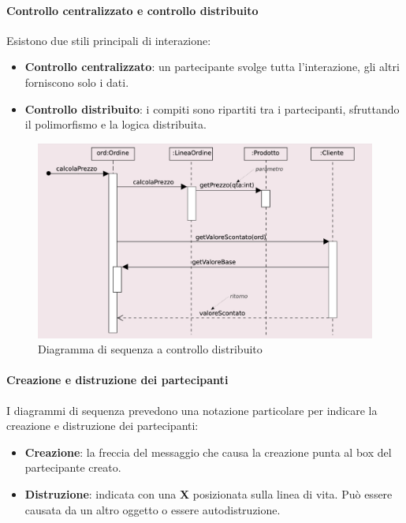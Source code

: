 \paragraph{Controllo centralizzato e controllo distribuito}
Esistono due stili principali di interazione:
\begin{itemize}
    \item \textbf{Controllo centralizzato}: un partecipante svolge tutta l’interazione, gli altri forniscono solo i dati.
    \item \textbf{Controllo distribuito}: i compiti sono ripartiti tra i partecipanti, sfruttando il polimorfismo e la logica distribuita.
\end{itemize}

\begin{figure}[H]
    \centering
    \includegraphics[width=0.75\linewidth]{assets/UML/sequence/sequence-2.png}
    \caption{Diagramma di sequenza a controllo distribuito}
\end{figure}

\paragraph{Creazione e distruzione dei partecipanti}
I diagrammi di sequenza prevedono una notazione particolare per indicare la creazione e distruzione dei partecipanti:
\begin{itemize}
    \item \textbf{Creazione}: la freccia del messaggio che causa la creazione punta al box del partecipante creato.
    \item \textbf{Distruzione}: indicata con una \textbf{X} posizionata sulla linea di vita. Può essere causata da un altro oggetto o essere autodistruzione.
\end{itemize}

